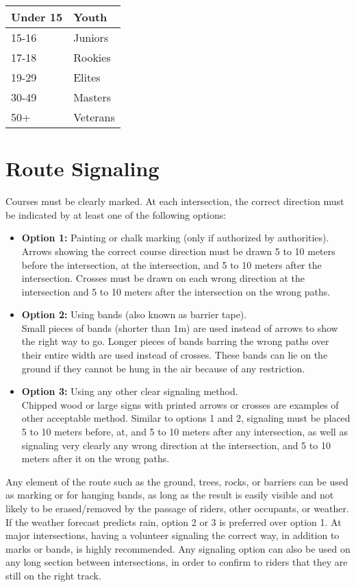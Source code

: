 \begin{tabular}{|l|l|}
\hline
Under 15 & Youth \\
\hline
15-16 & Juniors \\
\hline
17-18 & Rookies \\
\hline
19-29 & Elites \\
\hline
30-49 & Masters \\
\hline
50+ & Veterans \\
\hline
\end{tabular}

\section{Route Signaling}
Courses must be clearly marked.
At each intersection, the correct direction must be indicated by at least one of the following options:
\begin{itemize}
\item \textbf{Option 1:} Painting or chalk marking (only if authorized by authorities).\\
Arrows showing the correct course direction must be drawn 5 to 10 meters before the intersection, at the intersection, and 5 to 10 meters after the intersection.
Crosses must be drawn on each wrong direction at the intersection and 5 to 10 meters after the intersection on the wrong paths.
\item \textbf{Option 2:} Using bands (also known as barrier tape).\\
Small pieces of bands (shorter than 1m) are used instead of arrows to show the right way to go.
Longer pieces of bands barring the wrong paths over their entire width are used instead of crosses.
These bands can lie on the ground if they cannot be hung in the air because of any restriction.
\item \textbf{Option 3:} Using any other clear signaling method.\\
Chipped wood or large signs with printed arrows or crosses are examples of other acceptable method.
Similar to options 1 and 2, signaling must be placed 5 to 10 meters before, at, and 5 to 10 meters after any intersection, as well as signaling very clearly any wrong direction at the intersection, and 5 to 10 meters after it on the wrong paths.
\end{itemize}
Any element of the route such as the ground, trees, rocks, or barriers can be used as marking or for hanging bands, as long as the result is easily visible and not likely to be erased/removed by the passage of riders, other occupants, or weather.
If the weather forecast predicts rain, option 2 or 3 is preferred over option 1.
At major intersections, having a volunteer signaling the correct way, in addition to marks or bands, is highly recommended.
Any signaling option can also be used on any long section between intersections, in order to confirm to riders that they are still on the right track.

